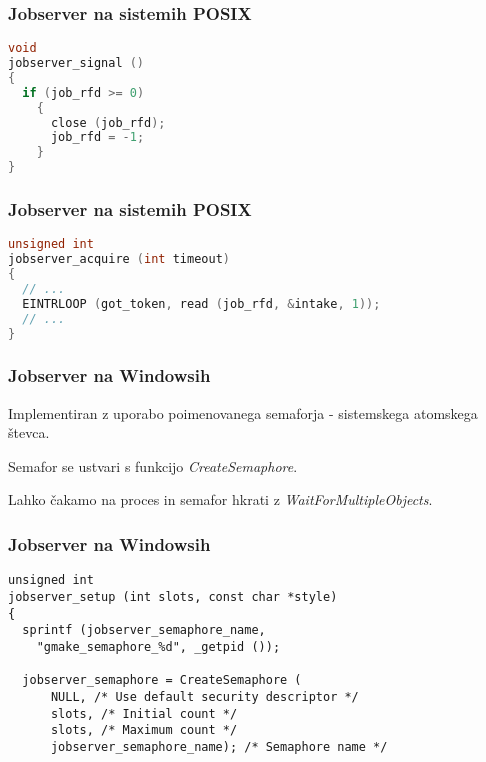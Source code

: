 \documentclass{beamer}
\begin{document}
\begin{frame}[fragile]
  \frametitle{Jobserver na sistemih POSIX}

\begin{lstlisting}[language=C, basicstyle=\sffamily]
void
jobserver_signal ()
{
  if (job_rfd >= 0)
    {
      close (job_rfd);
      job_rfd = -1;
    }
}
\end{lstlisting}
\end{frame}

\begin{frame}[fragile]
  \frametitle{Jobserver na sistemih POSIX}

\begin{lstlisting}[language=C, basicstyle=\sffamily]
unsigned int
jobserver_acquire (int timeout)
{
  // ...
  EINTRLOOP (got_token, read (job_rfd, &intake, 1));
  // ...
}
\end{lstlisting}
\end{frame}

\begin{frame}
  \frametitle{Jobserver na Windowsih}

  Implementiran z uporabo poimenovanega semaforja - sistemskega atomskega števca.

  Semafor se ustvari s funkcijo \textit{CreateSemaphore}.

  Lahko čakamo na proces in semafor hkrati z \textit{WaitForMultipleObjects}.
\end{frame}

\begin{frame}[fragile]
  \frametitle{Jobserver na Windowsih}
\begin{lstlisting}[basicstyle=\footnotesize]
unsigned int
jobserver_setup (int slots, const char *style)
{
  sprintf (jobserver_semaphore_name,
    "gmake_semaphore_%d", _getpid ());

  jobserver_semaphore = CreateSemaphore (
      NULL, /* Use default security descriptor */
      slots, /* Initial count */
      slots, /* Maximum count */
      jobserver_semaphore_name); /* Semaphore name */
\end{lstlisting}
\end{frame}  
\end{document}

